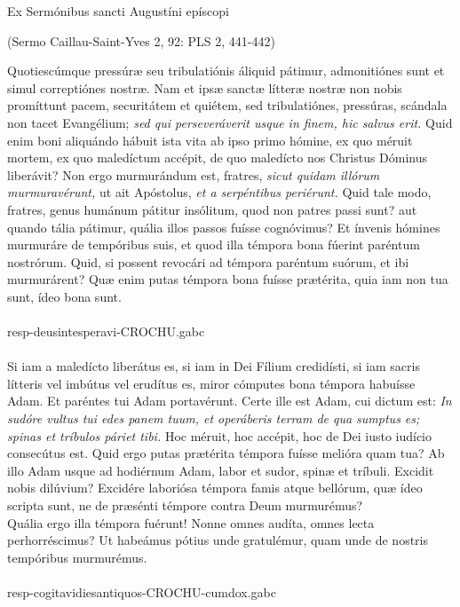 \documentclass[options]{article}
\begin{document}
	Ex Sermónibus sancti Augustíni epíscopi 
	\begin{flushright}
		(Sermo Caillau-Saint-Yves 2, 92: PLS 2, 441-442)
	\end{flushright}
Quotiescúmque pressúræ seu tribulatiónis áliquid pátimur, admonitiónes sunt et simul correptiónes nostræ. Nam et ipsæ sanctæ lítteræ nostræ non nobis promíttunt pacem, securitátem et quiétem, sed tribulatiónes, pressúras, scándala non tacet Evangélium; 
\emph{sed qui perseveráverit usque in finem, hic salvus erit.}
Quid enim boni aliquándo hábuit ista vita ab ipso primo hómine, ex quo méruit mortem, ex quo maledíctum accépit, de quo maledícto nos Christus Dóminus liberávit?
 Non ergo murmurándum est, fratres, 
 \emph{ sicut quidam illórum murmuravérunt,}
  ut ait Apóstolus, 
 \emph{ et a serpéntibus periérunt.}
 Quid tale modo, fratres, genus humánum pátitur insólitum, quod non patres passi sunt? aut quando tália pátimur, quália illos passos fuísse cognóvimus? Et ínvenis hómines murmuráre de tempóribus suis, et quod illa témpora bona fúerint paréntum nostrórum. Quid, si possent revocári ad témpora paréntum suórum, et ibi murmurárent? Quæ enim putas témpora bona fuísse prætérita, quia iam non tua sunt, ídeo bona sunt.\\
 \\
 resp-deusintesperavi-CROCHU.gabc\\
\\
  Si iam a maledícto liberátus es, si iam in Dei Fílium credidísti, si iam sacris lítteris vel imbútus vel erudítus es, miror cómputes bona témpora habuísse Adam. Et paréntes tui Adam portavérunt. Certe ille est Adam, cui dictum est: 
  \emph{In sudóre vultus tui edes panem tuum, et operáberis terram de qua sumptus es; spinas et tríbulos páriet tibi.}
  Hoc méruit, hoc accépit, hoc de Dei iusto iudício consecútus est. Quid ergo putas prætérita témpora fuísse melióra quam tua? Ab illo Adam usque ad hodiérnum Adam, labor et sudor, spinæ et tríbuli. Excidit nobis dilúvium? Excidére laboriósa témpora famis atque bellórum, quæ ídeo scripta sunt, ne de præsénti témpore contra Deum murmurémus?\\
    Quália ergo illa témpora fuérunt! Nonne omnes audíta, omnes lecta perhorréscimus? Ut habeámus pótius unde gratulémur, quam unde de nostris tempóribus murmurémus.
\\\\

resp-cogitavidiesantiquos-CROCHU-cumdox.gabc
  
	
\end{document}
